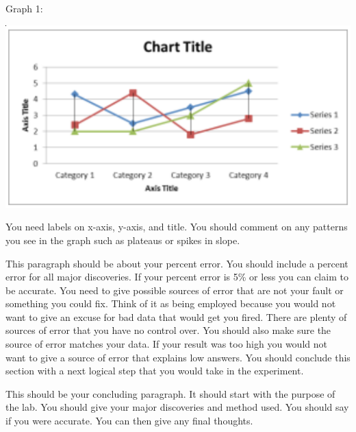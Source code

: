 \documentclass{report}
\begin{document}
\begin{flushleft}
Graph 1: 
\end{flushleft}
\begin{center}
\includegraphics[scale=.7]{graph}
\end{center}
\begin{flushleft}
You need labels on x-axis, y-axis, and title. You should comment on any patterns you see in the graph such as plateaus or spikes in slope.
\end{flushleft}
\hspace{6ex}This paragraph should be about your percent error. You should include a percent error for all major discoveries. If your percent error is 5\% or less you can claim to be accurate. You need to give possible sources of error that are not your fault or something you could fix. Think of it as being employed because you would not want to give an excuse for bad data that would get you fired. There are plenty of sources of error that you have no control over. You should also make sure the source of error matches your data. If your result was too high you would not want to give a source of error that explains low answers.  You should conclude this section with a next logical step that you would take in the experiment.
\begin{flushleft}
\hspace{6ex}This should be your concluding paragraph. It should start with the purpose of the lab. You should give your major discoveries and method used. You should say if you were accurate. You can then give any final thoughts.
\end{flushleft}
\end{document}
